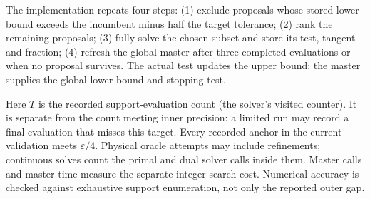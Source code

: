 \documentclass[11pt,a4paper]{article}
\begin{document}
The implementation repeats four steps: (1) exclude proposals whose stored lower bound exceeds the incumbent minus half the target tolerance; (2) rank the remaining proposals; (3) fully solve the chosen subset and store its test, tangent and fraction; (4) refresh the global master after three completed evaluations or when no proposal survives. The actual test updates the upper bound; the master supplies the global lower bound and stopping test.

Here $T$ is the recorded support-evaluation count (the solver's visited counter). It is separate from the count meeting inner precision: a limited run may record a final evaluation that misses this target. Every recorded anchor in the current validation meets $\varepsilon/4$. Physical oracle attempts may include refinements; continuous solves count the primal and dual solver calls inside them. Master calls and master time measure the separate integer-search cost. Numerical accuracy is checked against exhaustive support enumeration, not only the reported outer gap.
\end{document}
